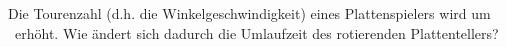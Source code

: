 Die Tourenzahl (d.h. die Winkelgeschwindigkeit) eines Plattenspielers wird um \pzO\ erhöht. Wie ändert sich dadurch die Umlaufzeit des rotierenden Plattentellers?
